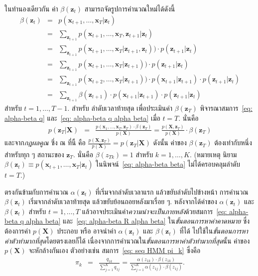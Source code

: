 ในทำนองเดียวกัน
ค่า
$\beta(\bm{z}_t)$
สามารถจัดรูปการคำนวณใหม่ได้ดังนี้
\begin{eqnarray}
\beta(\bm{z}_t)
&=& p(\bm{x}_{t+1}, \ldots, \bm{x}_T|\bm{z}_t)
\nonumber \\
&=& \sum_{\bm{z}_{t+1}} p(\bm{x}_{t+1}, \ldots, \bm{x}_T, \bm{z}_{t+1}|\bm{z}_t)
\nonumber \\
&=& \sum_{\bm{z}_{t+1}} p(\bm{x}_{t+1}, \ldots, \bm{x}_T|\bm{z}_{t+1},\bm{z}_t)) 
\cdot p(\bm{z}_{t+1}|\bm{z}_t)
\nonumber \\
&=& \sum_{\bm{z}_{t+1}} p(\bm{x}_{t+1}, \ldots, \bm{x}_T|\bm{z}_{t+1})) 
\cdot p(\bm{z}_{t+1}|\bm{z}_t)
\nonumber \\
&=& \sum_{\bm{z}_{t+1}} p(\bm{x}_{t+2}, \ldots, \bm{x}_T|\bm{z}_{t+1}))
\cdot p(\bm{x}_{t+1}|\bm{z}_{t+1}) 
\cdot p(\bm{z}_{t+1}|\bm{z}_t)
\nonumber \\
&=& \sum_{\bm{z}_{t+1}} \beta(\bm{z}_{t+1})
\cdot p(\bm{x}_{t+1}|\bm{z}_{t+1}) 
\cdot p(\bm{z}_{t+1}|\bm{z}_t)
\label{eq: HMM alpha-beta beta}
\end{eqnarray}
สำหรับ $t = 1, \ldots, T-1$.
สำหรับ ลำดับเวลาท้ายสุด 
เพื่อประเมินค่า $\beta(\bm{z}_T)$ พิจารณาสมการ~\ref{eq: alpha-beta q} และ~\ref{eq: alpha-beta q alpha beta} 
เมื่อ $t = T$.
นั่นคือ
\begin{eqnarray}
p(\bm{z}_T|\bm{X})
&=&
\frac{p(\bm{x}_1, \ldots, \bm{x}_T,\bm{z}_T) \cdot \beta(\bm{z}_T) }{p(\bm{X})} 
= \frac{p(\bm{X}, \bm{z}_T)}{p(\bm{X})} \cdot \beta(\bm{z}_T) 
\end{eqnarray}
และจาก\textit{กฎผลคูณ} ซึ่ง ณ ที่นี้ คือ
$\frac{p(\bm{X}, \bm{z}_T)}{p(\bm{X})} = p(\bm{z}_T|\bm{X})$
ดังนั้น ค่าของ $\beta(\bm{z}_T)$ ต้องเท่ากับหนึ่ง
สำหรับทุก ๆ สถานะของ $\bm{z}_T$.
นั่นคือ
$\beta(z_{Tk}) = 1$ สำหรับ $k = 1, \ldots, K$.
(หมายเหตุ นิยาม $\beta(\bm{z}_t) \equiv p(\bm{x}_{t+1}, \ldots, \bm{x}_T| \bm{z}_t)$
	ในนิพจน์~\ref{eq: alpha-beta beta} ไม่ได้ครอบคลุมลำดับ $t = T$.)

ตรงกันข้ามกับการคำนวณ $\alpha(\bm{z}_t)$ ที่เริ่มจากลำดับเวลาแรก แล้วขยับลำดับไปข้างหน้า
การคำนวณ $\beta(\bm{z}_t)$ เริ่มจากลำดับเวลาท้ายสุด แล้วขยับย้อนถอยหลังมาเรื่อย ๆ.
หลังจากได้ค่าของ $\alpha(\bm{z}_t)$ และ $\beta(\bm{z}_t)$ สำหรับ $t = 1, \ldots, T$
แล้วอาจประเมินค่า\textit{ความน่าจะเป็นภายหลัง}ด้วยสมการ~\ref{eq: alpha-beta q alpha beta} และ~\ref{eq: alpha-beta R alpha beta}
ใน\textit{ขั้นตอนการหาค่าคาดหมาย}
ซึ่งต้องการค่า $p(\bm{X})$ ประกอบ
หรือ อาจนำค่า $\alpha(\bm{z}_t)$ และ $\beta(\bm{z}_t)$ ที่ได้
ไปใช้ใน\textit{ขั้นตอนการหาค่าตัวทำมากที่สุด}โดยตรงเลยก็ได้
เนื่องจากการคำนวณใน\textit{ขั้นตอนการหาค่าตัวทำมากที่สุด}นั้น
ค่าของ $p(\bm{X})$ จะหักล้างกันเอง ตัวอย่างเช่น สมการ~\ref{eq: seq HMM pi_k} ซึ่งคือ
\begin{eqnarray}
\pi_k &=& \frac{q_{1k}}{\sum_{j=1}^K q_{1j}}
= \frac{\alpha(z_{1k}) \cdot \beta(z_{1k})}{\sum_{j=1}^K \alpha(z_{1j}) \cdot \beta(z_{1j})}
\label{eq: seq HMM pi_k alpha beta} .
\end{eqnarray}

